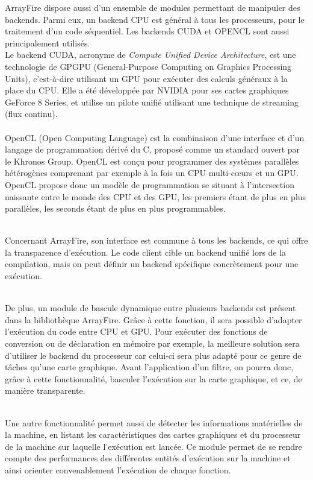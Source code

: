 \documentclass[10pt]{report}
\begin{document}
	ArrayFire dispose aussi d'un ensemble de modules permettant de manipuler des backends. Parmi eux, un backend CPU est général à tous les processeurs, pour le traitement d'un code séquentiel. Les backends CUDA et OPENCL sont aussi principalement utilisés.\\
	Le backend CUDA, acronyme de \textit{Compute Unified Device Architecture}, est une technologie de GPGPU (General-Purpose Computing on Graphics Processing Units), c'est-à-dire utilisant un GPU pour exécuter des calculs généraux à la place du CPU.
	Elle a été développée par NVIDIA pour ses cartes graphiques GeForce 8 Series, et utilise un pilote unifié utilisant une technique de streaming (flux continu). \\
	\\OpenCL (Open Computing Language) est la combinaison d'une interface et d'un langage de programmation dérivé du C, proposé comme un standard ouvert par le Khronos Group. OpenCL est conçu pour programmer des systèmes parallèles hétérogènes comprenant par exemple à la fois un CPU multi-cœurs et un GPU. OpenCL propose donc un modèle de programmation se situant à l'intersection naissante entre le monde des CPU et des GPU, les premiers étant de plus en plus parallèles, les seconds étant de plus en plus programmables.\\ ~\par
	
	Concernant ArrayFire, son interface est commune à tous les backends, ce qui offre la transparence d'exécution. Le code client cible un backend unifié lors de la compilation, mais on peut définir un backend spécifique concrètement pour une exécution.\\ ~\par
	De plus, un module de bascule dynamique entre plusieurs backends est présent dans la bibliothèque ArrayFire. Grâce à cette fonction, il sera possible d'adapter l'exécution du code entre CPU et GPU. Pour exécuter des fonctions de conversion ou de déclaration en mémoire par exemple, la meilleure solution sera d'utiliser le backend du processeur car celui-ci sera plus adapté pour ce genre de tâches qu'une carte graphique. Avant l'application d'un filtre, on pourra donc, grâce à cette fonctionnalité, basculer l'exécution sur la carte graphique, et ce, de manière transparente.\\ ~\par
	Une autre fonctionnalité permet aussi de détecter les informations matérielles de la machine, en listant les caractéristiques des cartes graphiques et du processeur de la machine sur laquelle l'exécution est lancée. Ce module permet de se rendre compte des performances des différentes entités d'exécution sur la machine et ainsi orienter convenablement l'exécution de chaque fonction.
	\vspace{1cm}
	
\end{document}
